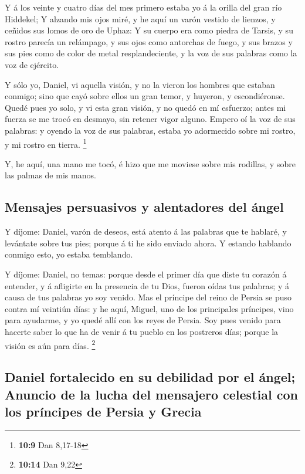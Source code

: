  Y á los veinte y cuatro días del mes primero estaba yo á la
orilla del gran río Hiddekel;  Y alzando mis ojos miré, y he
aquí un varón vestido de lienzos, y ceñidos sus lomos de oro de Uphaz:
 Y su cuerpo era como piedra de Tarsis, y su rostro parecía
un relámpago, y sus ojos como antorchas de fuego, y sus brazos y sus
pies como de color de metal resplandeciente, y la voz de sus palabras
como la voz de ejército.

 Y sólo yo, Daniel, vi aquella visión, y no la vieron los
hombres que estaban conmigo; sino que cayó sobre ellos un gran temor, y
huyeron, y escondiéronse.  Quedé pues yo solo, y vi esta
gran visión, y no quedó en mí esfuerzo; antes mi fuerza se me trocó en
desmayo, sin retener vigor alguno.  Empero oí la voz de sus
palabras: y oyendo la voz de sus palabras, estaba yo adormecido sobre mi
rostro, y mi rostro en tierra. \footnote{\textbf{10:9} Dan 8,17-18}

 Y, he aquí, una mano me tocó, é hizo que me moviese sobre
mis rodillas, y sobre las palmas de mis manos.

\hypertarget{mensajes-persuasivos-y-alentadores-del-uxe1ngel}{%
\subsection{Mensajes persuasivos y alentadores del
ángel}\label{mensajes-persuasivos-y-alentadores-del-uxe1ngel}}

 Y díjome: Daniel, varón de deseos, está atento á las
palabras que te hablaré, y levántate sobre tus pies; porque á ti he sido
enviado ahora. Y estando hablando conmigo esto, yo estaba temblando.

 Y díjome: Daniel, no temas: porque desde el primer día que
diste tu corazón á entender, y á afligirte en la presencia de tu Dios,
fueron oídas tus palabras; y á causa de tus palabras yo soy venido.
 Mas el príncipe del reino de Persia se puso contra mí
veintiún días: y he aquí, Miguel, uno de los principales príncipes, vino
para ayudarme, y yo quedé allí con los reyes de Persia. 
Soy pues venido para hacerte saber lo que ha de venir á tu pueblo en los
postreros días; porque la visión es aún para días. \footnote{\textbf{10:14}
  Dan 9,22}

\hypertarget{daniel-fortalecido-en-su-debilidad-por-el-uxe1ngel-anuncio-de-la-lucha-del-mensajero-celestial-con-los-pruxedncipes-de-persia-y-grecia}{%
\subsection{Daniel fortalecido en su debilidad por el ángel; Anuncio de
la lucha del mensajero celestial con los príncipes de Persia y
Grecia}\label{daniel-fortalecido-en-su-debilidad-por-el-uxe1ngel-anuncio-de-la-lucha-del-mensajero-celestial-con-los-pruxedncipes-de-persia-y-grecia}}

